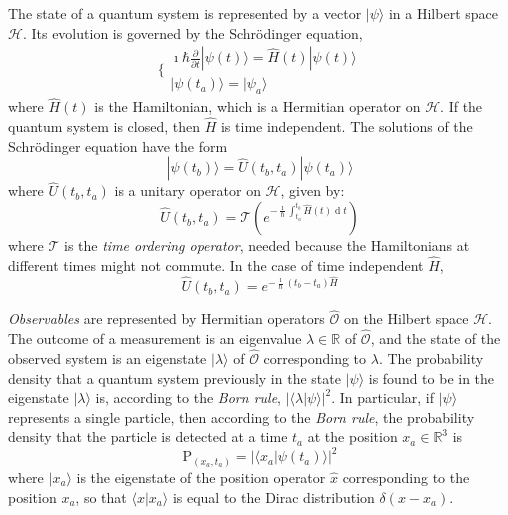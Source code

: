 \documentclass[11pt]{amsart}
\theoremstyle{definition}
\theoremstyle{plain}
\begin{document}
The state of a quantum system is represented by a vector $|{\psi}\rangle$ in a Hilbert space $\mathcal{H}$. Its evolution is governed by the Schr\"odinger equation, 
\begin{equation}
\label{eq_schrod}
\Bigg\{
\begin{array}{ll}
	\imath\hbar\frac{\partial}{\partial t}|{\psi(t)}\rangle=\hat H(t)|{\psi(t)}\rangle \\
	|{\psi(t_a)}\rangle=|{\psi_a}\rangle
\end{array}
\end{equation}
where $\hat H(t)$ is the Hamiltonian, which is a Hermitian operator on $\mathcal{H}$. If the quantum system is closed, then $\hat H$ is time independent.
The solutions of the Schr\"odinger equation have the form
\begin{equation}
\label{eq_unitary_evolution}
|{\psi(t_b)}\rangle=\hat U(t_b,t_a)|{\psi(t_a)}\rangle
\end{equation}
where $\hat U(t_b,t_a)$ is a unitary operator on $\mathcal{H}$, given by:
\begin{equation}
\label{eq_unitary_evolution_operator}
\hat U(t_b,t_a) = \mathcal T\left(e^{-\frac{\imath}{\hbar} \int_{t_a}^{t_b}\hat H(t)\operatorname{d} t}\right)
\end{equation}
where $\mathcal T$ is the \emph{time ordering operator}, needed because the Hamiltonians at different times might not commute.
In the case of time independent $\hat H$,
\begin{equation}
\label{eq_unitary_evolution_operator_time_independent}
\hat U(t_b,t_a)=e^{-\frac{\imath}{\hbar} \left(t_b-t_a\right)\hat H}
\end{equation}

\emph{Observables} are represented by Hermitian operators $\hat {\mathcal O}$ on the Hilbert space $\mathcal{H}$. The outcome of a measurement is an eigenvalue $\lambda\in\mathbb{R}$ of $\hat {\mathcal O}$, and the state of the observed system is an eigenstate $|{\lambda}\rangle$ of $\hat {\mathcal O}$ corresponding to $\lambda$. The probability density that a quantum system previously in the state $|{\psi}\rangle$ is found to be in the eigenstate $|{\lambda}\rangle$ is, according to the \emph{Born rule}, $|\langle{\lambda}|{\psi}\rangle|^2$.
In particular, if $|{\psi}\rangle$ represents a single particle, then according to the \emph{Born rule}, the probability density that the particle is detected at a time $t_a$ at the position $x_a\in\mathbb{R}^3$ is
\begin{equation}
\label{eq_Born_rule_position}
\text{P}_{(x_a,t_a)}=|\langle{x_a}|{\psi(t_a)}\rangle|^2
\end{equation}
where $|{x_a}\rangle$ is the eigenstate of the position operator $\hat x$ corresponding to the position $x_a$, so that $\langle{x}|{x_a}\rangle$ is equal to the Dirac distribution $\delta(x-x_a)$.
\end{document}
